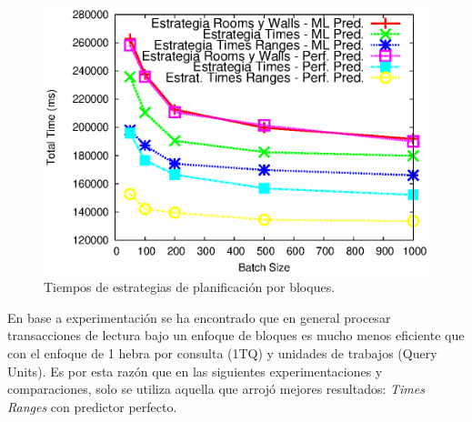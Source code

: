 \begin{figure}[!ht]
\centering
\includegraphics[scale=.75]{images/scheduler_all_16threads.eps}
\caption{Tiempos de estrategias de planificación por bloques.}
\label{fig:scheduler_all_16threads}
\end{figure}

En base a experimentación se ha encontrado que en general procesar transacciones de lectura bajo un enfoque de bloques \citep{Ye:2007} es mucho menos eficiente que con el enfoque de 1 hebra por consulta (1TQ) y unidades de trabajos (Query Units). Es por esta razón que en las siguientes experimentaciones y comparaciones, solo se utiliza aquella que arrojó mejores resultados: \textit{Times Ranges} con predictor perfecto.


